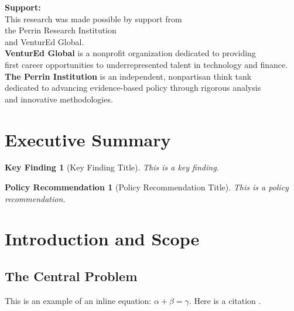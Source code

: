 \documentclass[11pt,letterpaper]{report}
\newtheorem{finding}{Key Finding}[chapter]
\newtheorem{recommendation}{Policy Recommendation}[chapter]
\theoremstyle{definition}
\theoremstyle{remark}
\begin{document}
\newpage
\thispagestyle{empty}
\vspace*{\fill} %
{\footnotesize
\begin{center}
\textbf{Support:}\\
This research was made possible by support from \\
the Perrin Research Institution\\
and VenturEd Global.\\[0.5cm]

\textbf{VenturEd Global} is a nonprofit organization dedicated to providing\\
first career opportunities to underrepresented talent in technology and finance.\\[0.5cm]

\textbf{The Perrin Institution} is an independent, nonpartisan think tank\\
dedicated to advancing evidence-based policy through rigorous analysis\\
and innovative methodologies.
\end{center}
}
\newpage

\tableofcontents
\newpage

\chapter*{Executive Summary}
\lipsum[1-2]

\begin{finding}[Key Finding Title]
This is a key finding. \lipsum[3]
\end{finding}

\begin{recommendation}[Policy Recommendation Title]
This is a policy recommendation. \lipsum[4]
\end{recommendation}

\chapter{Introduction and Scope}
\lipsum[1]

\section{The Central Problem}
\lipsum[2-3]

This is an example of an inline equation: $\alpha + \beta = \gamma$. Here is a citation \citep{Manski2003}.
\end{document}
